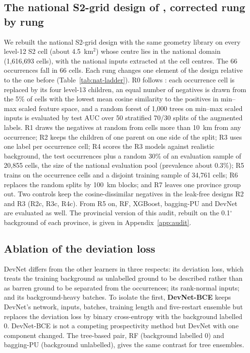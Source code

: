 \documentclass[pdflatex,sn-apa]{sn-jnl}
\begin{document}
\subsection{The national S2-grid design of \citet{Parsa2024}, corrected rung by rung}\label{sec:audit-methods}

We rebuilt the national S2-grid design with the same geometry library on every level-12 S2 cell (about 4.5~km$^2$) whose centre lies in the national domain (1,616,693 cells), with the national inputs extracted at the cell centres. The 66 occurrences fall in 66 cells. Each rung changes one element of the design relative to the one before (Table~\ref{tab:nat-ladder}). R0 follows \citet{Parsa2024}: each occurrence cell is replaced by its four level-13 children, an equal number of negatives is drawn from the 5\% of cells with the lowest mean cosine similarity to the positives in min--max scaled feature space, and a random forest of 1,000 trees on min--max scaled inputs is evaluated by test AUC over 50 stratified 70/30 splits of the augmented labels. R1 draws the negatives at random from cells more than 10~km from any occurrence; R2 keeps the children of one parent on one side of the split; R3 uses one label per occurrence cell; R4 scores the R3 models against realistic background, the test occurrences plus a random 30\% of an evaluation sample of 20,855 cells, the size of the national evaluation pool (prevalence about 0.3\%); R5 trains on the occurrence cells and a disjoint training sample of 34,761 cells; R6 replaces the random splits by 100~km blocks; and R7 leaves one province group out. Two controls keep the cosine-dissimilar negatives in the leak-free designs R2 and R3 (R2c, R3c, R4c). From R5 on, RF, XGBoost, bagging-PU and DevNet are evaluated as well. The provincial version of this audit, rebuilt on the 0.1$^\circ$ background of each province, is given in Appendix~\ref{app:audit}.

\subsection{Ablation of the deviation loss}\label{sec:ablation-methods}

DevNet differs from the other learners in three respects: its deviation loss, which treats the training background as unlabelled ground to be described rather than as barren ground to be separated from the occurrences; its rank-normal inputs; and its background-heavy batches. To isolate the first, \textbf{DevNet-BCE} keeps DevNet's network, inputs, batches, training length and five-restart ensemble but replaces the deviation loss by binary cross-entropy with the background labelled 0. DevNet-BCE is not a competing prospectivity method but DevNet with one component changed. The tree-based pair, RF (background labelled 0) and bagging-PU (background unlabelled), gives the same contrast for tree ensembles.
\end{document}
